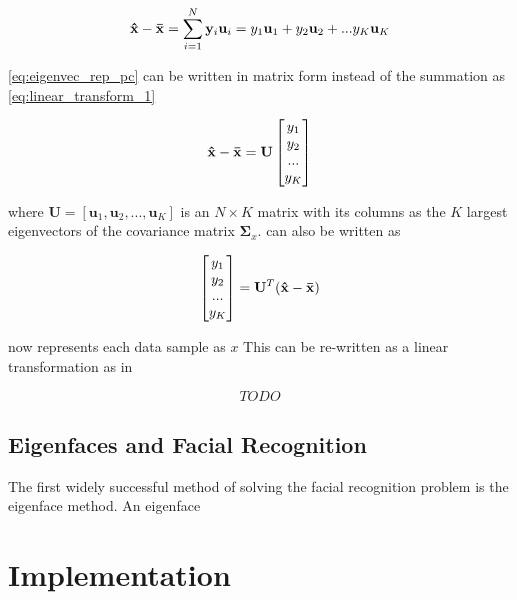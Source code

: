 \documentclass[headings=optiontoheadandtoc,listof=totoc,parskip=full]{scrartcl}
\begin{document}
\begin{equation}\label{eq:eigenvec_rep_pc}
    \mathbf{\hat{x}} - \mathbf{\Bar{x}} = \sum_{i = 1}^N \mathbf{y}_i\mathbf{u}_i = y_1\mathbf{u}_1 + y_2\mathbf{u}_2 + ... y_K\mathbf{u}_K
\end{equation}

\cref{eq:eigenvec_rep_pc} can be written in matrix form instead of the summation as \cref{eq:linear_transform_1}

\begin{equation}\label{eq:linear_transform_1}
    \mathbf{\hat{x}} - \mathbf{\Bar{x}} = \mathbf{U}\begin{bmatrix}y_1\\y_2\\...\\y_K\end{bmatrix}
\end{equation}

where $\mathbf{U} = [\mathbf{u}_1, \mathbf{u}_2, ... , \mathbf{u}_K]$ is an $N \times K$ matrix with its columns as the $K$ largest eigenvectors of the covariance matrix $\mathbf{\Sigma}_x$.  can also be written as 

\begin{equation}\label{eq:linear_transform_2}
    \begin{bmatrix}y_1\\y_2\\...\\y_K\end{bmatrix} = \mathbf{U}^T(\mathbf{\hat{x}} - \mathbf{\Bar{x}})
\end{equation}

now represents each data sample as $x$  This can be re-written as a linear transformation as in 

\begin{equation}
    TODO
\end{equation}

\subsection{Eigenfaces and Facial Recognition}

The first widely successful method of solving the facial recognition problem is the eigenface method. An eigenface


\section{Implementation}
\end{document}
